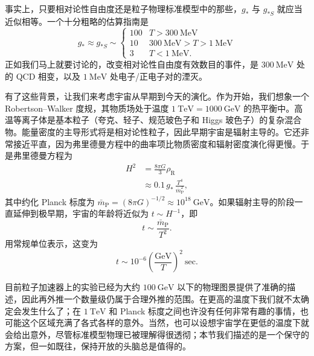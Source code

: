 事实上，只要相对论性自由度还是粒子物理标准模型中的那些，$g_{*}$ 与 $g_{*S}$ 就应当近似相等。一个十分粗略的估算指南是
\begin{equation*}
g_{*} \approx g_{*S} \sim
\left\{
\begin{array}{ll}
100 & T > 300~\mathrm{MeV} \\
10 & 300~\mathrm{MeV} > T > 1~\mathrm{MeV} \\
3 & T < 1~\mathrm{MeV}.
\end{array}
\right.
\tag{8.176}
\end{equation*}
正如我们马上就要讨论的，改变相对论性自由度有效数目的事件，是 $300~\mathrm{MeV}$ 处的 QCD 相变，以及 $1~\mathrm{MeV}$ 处电子/正电子对的湮灭。

有了这些背景，让我们来考虑宇宙从早期到今天的演化。作为开始，我们想象一个 Robertson--Walker 度规，其物质场处于温度 $1~\mathrm{TeV}=1000~\mathrm{GeV}$ 的热平衡中。高温等离子体是基本粒子（夸克、轻子、规范玻色子和 Higgs 玻色子）的复杂混合物。能量密度的主导形式将是相对论性粒子，因此早期宇宙是辐射主导的。它还非常接近平直，因为弗里德曼方程中的曲率项比物质密度和辐射密度演化得更慢。于是弗里德曼方程为
\begin{equation*}
\begin{aligned}
H^{2} &= \frac{8\pi G}{3}\rho_{\mathrm{R}} \\
&\approx 0.1\,g_{*}\,\frac{T^{4}}{\bar{m}_{\mathrm{P}}^{2}},
\end{aligned}
\tag{8.177}
\end{equation*}
其中约化 Planck 标度为 $\bar{m}_{\mathrm{P}}=(8\pi G)^{-1/2}\approx 10^{18}~\mathrm{GeV}$。如果辐射主导的阶段一直延伸到极早期，宇宙的年龄将近似为 $t\sim H^{-1}$，即
\begin{equation*}
t \sim \frac{\bar{m}_{\mathrm{P}}}{T^{2}}.
\tag{8.178}
\end{equation*}
用常规单位表示，这变为
\begin{equation*}
t \sim 10^{-6}\left(\frac{\mathrm{GeV}}{T}\right)^{2}~\mathrm{sec}.
\tag{8.179}
\end{equation*}

目前粒子加速器上的实验已经为大约 $100~\mathrm{GeV}$ 以下的物理图景提供了准确的描述，因此再外推一个数量级仍属于合理外推的范围。在更高的温度下我们就不太确定会发生什么了；在 $1~\mathrm{TeV}$ 和 Planck 标度之间也许没有任何非常有趣的事情，也可能这个区域充满了各式各样的意外。当然，也可以设想宇宙学在更低的温度下就会给出意外，尽管标准模型物理已被理解得很透彻；本节我们描述的是一个保守的方案，但一如既往，保持开放的头脑总是值得的。


